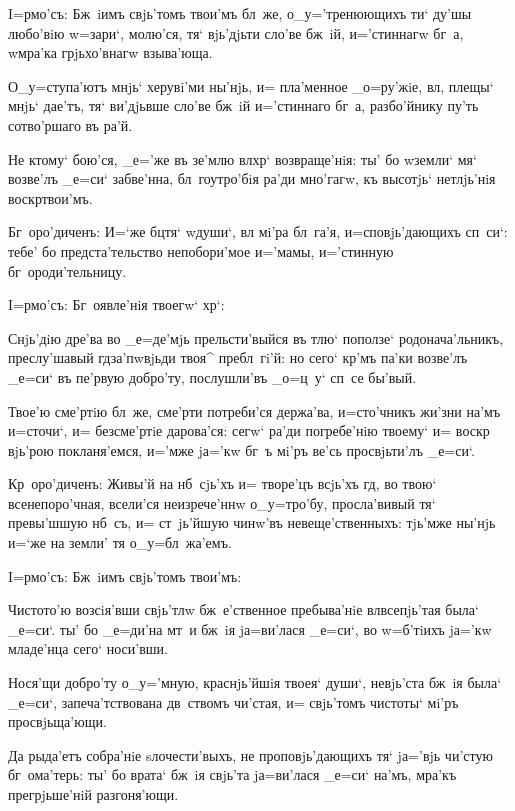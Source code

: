 
I=рмо'съ: Бж~iимъ свjь'томъ твои'мъ бл~же, 
о_у='тренюющихъ ти` ду'шы любо'вiю w=зари`, молю'ся, тя` 
вjь'дjьти сло'ве бж~iй, и='стиннагw бг~а, w\т мра'ка 
грjьхо'внагw взыва'юща.

О_у=ступа'ютъ мнjь` херувi'ми ны'нjь, и= пла'менное 
_о=ру'жiе, вл, плещы` мнjь` дае'тъ, тя` ви'дjьвше 
сло'ве бж~iй и='стиннаго бг~а, разбо'йнику пу'ть 
сотво'ршаго въ ра'й.

Не ктому` бою'ся, _е='же въ зе'млю вл хр` 
возвраще'нiя: ты' бо w\т земли` мя` возве'лъ _е=си` 
забве'нна, бл~гоутро'бiя ра'ди мно'гагw, къ высотjь` 
нетлjь'нiя воскр твои'мъ.

Бг~оро'диченъ: И=`же бц тя` w\т души`, вл 
мi'ра бл~га'я, и=сповjь'дающихъ сп~си`: тебе' бо 
предста'тельство непобори'мое и='мамы, и='стинную 
бг~ороди'тельницу. 

 I=рмо'съ: Бг~оявле'нiя твоегw` хр`:

Снjь'дiю дре'ва во _е=де'мjь прельсти'выйся въ тлю` 
поползе` родонача'льникъ, преслу'шавый гд за'пwвjьди 
твоя^ пребл~гi'й: но сего` кр'мъ па'ки возве'лъ 
_е=си` въ пе'рвую добро'ту, послушли'въ _о=ц~у` сп~се 
бы'вый.

Твое'ю сме'ртiю бл~же, сме'рти потреби'ся держа'ва, 
и=сто'чникъ жи'зни на'мъ и=сточи`, и= безсме'ртiе 
дарова'ся: сегw` ра'ди погребе'нiю твоему` и= воскр 
вjь'рою покланя'емся, и='мже jа='кw бг~ъ мi'ръ ве'сь 
просвjьти'лъ _е=си`.

Кр~оро'диченъ: Живы'й на нб~сjь'хъ и= творе'цъ 
всjь'хъ гд, во твою` всенепоро'чная, всели'ся 
неизрече'ннw о_у=тро'бу, просла'вивый тя` превы'шшую 
нб~съ, и= ст~jь'йшую чинw'въ невеще'ственныхъ: тjь'мже 
ны'нjь и=`же на земли' тя о_у=бл~жа'емъ. 

 I=рмо'съ: Бж~iимъ свjь'томъ твои'мъ:

Чистото'ю возсiя'вши свjь'тлw бж~е'ственное 
пребыва'нiе вл всепjь'тая была` _е=си`. ты' бо 
_е=ди'на мт~и бж~iя jа=ви'лася _е=си`, во w=б'тiихъ 
jа='кw младе'нца сего` носи'вши.

Нося'щи добро'ту о_у='мную, краснjь'йшiя твоея` души`, 
невjь'ста бж~iя была` _е=си`, запеча'тствована дв~ствомъ 
чи'стая, и= свjь'томъ чистоты` мi'ръ просвjьща'ющи.

Да рыда'етъ собра'нiе sлочести'выхъ, не 
проповjь'дающихъ тя` jа='вjь чи'стую бг~ома'терь: ты' бо 
врата` бж~iя свjь'та jа=ви'лася _е=си` на'мъ, мра'къ 
прегрjьше'нiй разгоня'ющи.

